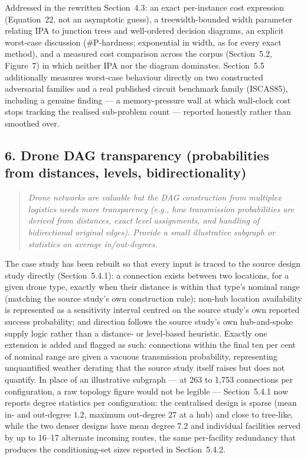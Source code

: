 \documentclass[11pt]{article}
\newenvironment{revcomment}
  {\begin{quote}\itshape\color{gray!60!black}}
  {\end{quote}}
\begin{document}
Addressed in the rewritten Section~4.3: an exact per-instance cost expression (Equation~22, not an asymptotic guess), a treewidth-bounded width parameter relating IPA to junction trees and well-ordered decision diagrams, an explicit worst-case discussion (\#P-hardness; exponential in width, as for every exact method), and a measured cost comparison across the corpus (Section~5.2, Figure~7) in which neither IPA nor the diagram dominates. Section~5.5 additionally measures worst-case behaviour directly on two constructed adversarial families and a real published circuit benchmark family (ISCAS85), including a genuine finding --- a memory-pressure wall at which wall-clock cost stops tracking the realised sub-problem count --- reported honestly rather than smoothed over.

\subsection*{6. Drone DAG transparency (probabilities from distances, levels, bidirectionality)}
\begin{revcomment}
Drone networks are valuable but the DAG construction from multiplex logistics needs more transparency (e.g., how transmission probabilities are derived from distances, exact level assignments, and handling of bidirectional original edges). Provide a small illustrative subgraph or statistics on average in/out-degrees.
\end{revcomment}

The case study has been rebuilt so that every input is traced to the source design study directly (Section~5.4.1): a connection exists between two locations, for a given drone type, exactly when their distance is within that type's nominal range (matching the source study's own construction rule); non-hub location availability is represented as a sensitivity interval centred on the source study's own reported success probability; and direction follows the source study's own hub-and-spoke supply logic rather than a distance- or level-based heuristic. Exactly one extension is added and flagged as such: connections within the final ten per cent of nominal range are given a vacuous transmission probability, representing unquantified weather derating that the source study itself raises but does not quantify. In place of an illustrative subgraph --- at 263 to 1{,}753 connections per configuration, a raw topology figure would not be legible --- Section~5.4.1 now reports degree statistics per configuration: the centralised design is sparse (mean in- and out-degree $1.2$, maximum out-degree $27$ at a hub) and close to tree-like, while the two denser designs have mean degree $7.2$ and individual facilities served by up to 16--17 alternate incoming routes, the same per-facility redundancy that produces the conditioning-set sizes reported in Section~5.4.2.
\end{document}
